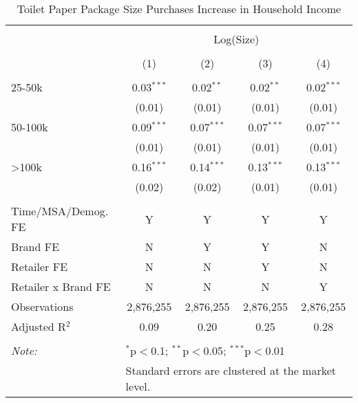 
\begin{table}[!htbp] \centering 
  \caption{Toilet Paper Package Size Purchases Increase in Household Income} 
  \label{tab:tpQOverview} 
\begin{tabular}{@{\extracolsep{5pt}}lcccc} 
\\[-1.8ex]\hline 
\hline \\[-1.8ex] 
 & \multicolumn{4}{c}{Log(Size)} \\ 
\\[-1.8ex] & (1) & (2) & (3) & (4)\\ 
\hline \\[-1.8ex] 
 25-50k & 0.03$^{***}$ & 0.02$^{**}$ & 0.02$^{**}$ & 0.02$^{***}$ \\ 
  & (0.01) & (0.01) & (0.01) & (0.01) \\ 
  50-100k & 0.09$^{***}$ & 0.07$^{***}$ & 0.07$^{***}$ & 0.07$^{***}$ \\ 
  & (0.01) & (0.01) & (0.01) & (0.01) \\ 
  >100k & 0.16$^{***}$ & 0.14$^{***}$ & 0.13$^{***}$ & 0.13$^{***}$ \\ 
  & (0.02) & (0.02) & (0.01) & (0.01) \\ 
 \hline \\[-1.8ex] 
Time/MSA/Demog. FE & Y & Y & Y & Y \\ 
Brand FE & N & Y & Y & N \\ 
Retailer FE & N & N & Y & N \\ 
Retailer x Brand FE & N & N & N & Y \\ 
Observations & 2,876,255 & 2,876,255 & 2,876,255 & 2,876,255 \\ 
Adjusted R$^{2}$ & 0.09 & 0.20 & 0.25 & 0.28 \\ 
\hline 
\hline \\[-1.8ex] 
\textit{Note:}  & \multicolumn{4}{l}{$^{*}$p$<$0.1; $^{**}$p$<$0.05; $^{***}$p$<$0.01} \\ 
 & \multicolumn{4}{l}{Standard errors are clustered at the market level.} \\ 
\end{tabular} 
\end{table} 
